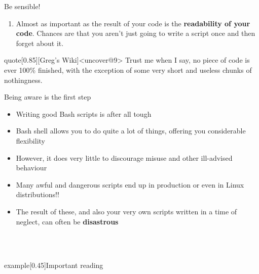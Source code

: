 \begin{frame}{Be sensible!}
{\begin{onlyenv}
\begin{enumerate}[<+->]
                      \alert{Do not copy/paste from them!}
                \item Almost as important as the result of your code is the \textbf{readability of your code}.
                      Chances are that you aren't just going to write a script once and then forget about it.
            \end{enumerate}
            \vspace{3mm}
            \begin{varblock}{quote}[0.85\textwidth]{}[Greg's Wiki]<uncover@9>
                Trust me when I say, no piece of code is ever 100\% finished, with the exception of some very short and useless chunks of nothingness.
            \end{varblock}
        \end{onlyenv}
    }
\end{frame}
\begin{frame}{Being aware is the first step}
    \begin{itemize}
        \item Writing good Bash scripts is after all tough
        \item Bash shell allows you to do quite a lot of things, offering you considerable flexibility
        \item However, it does very little to discourage misuse and other ill-advised behaviour
        \item Many awful and dangerous scripts end up in production or even in Linux distributions!!
        \item The result of these, and also your very own scripts written in a time of neglect, can often be \textbf{disastrous}
    \end{itemize}
    \begin{lrbox}{\tmpbox}
        \begin{minipage}{0.85\textwidth}
            \\
            \\
        \end{minipage}
    \end{lrbox}
    \begin{varblock*}{example}[0.45\textwidth]{Important reading}
        \usebox{\tmpbox}
    \end{varblock*}
\end{frame}
